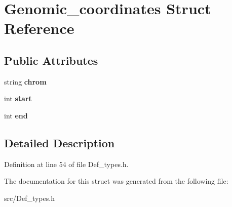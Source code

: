 \hypertarget{struct_genomic__coordinates}{}\section{Genomic\+\_\+coordinates Struct Reference}
\label{struct_genomic__coordinates}
\subsection*{Public Attributes}
\begin{DoxyCompactItemize}
\item 
\mbox{\label{struct_genomic__coordinates_af8b95b0f52a74be910c6f019be87690a}} 
string {\bfseries chrom}
\item 
\mbox{\label{struct_genomic__coordinates_a82f9fbf6d38c05c5bbb2ceefedc782ce}} 
int {\bfseries start}
\item 
\mbox{\label{struct_genomic__coordinates_a9ba5009878229e897fec5059f2a57e8b}} 
int {\bfseries end}
\end{DoxyCompactItemize}


\subsection{Detailed Description}


Definition at line 54 of file Def\+\_\+types.\+h.



The documentation for this struct was generated from the following file\+:\begin{DoxyCompactItemize}
\item 
src/Def\+\_\+types.\+h\end{DoxyCompactItemize}
